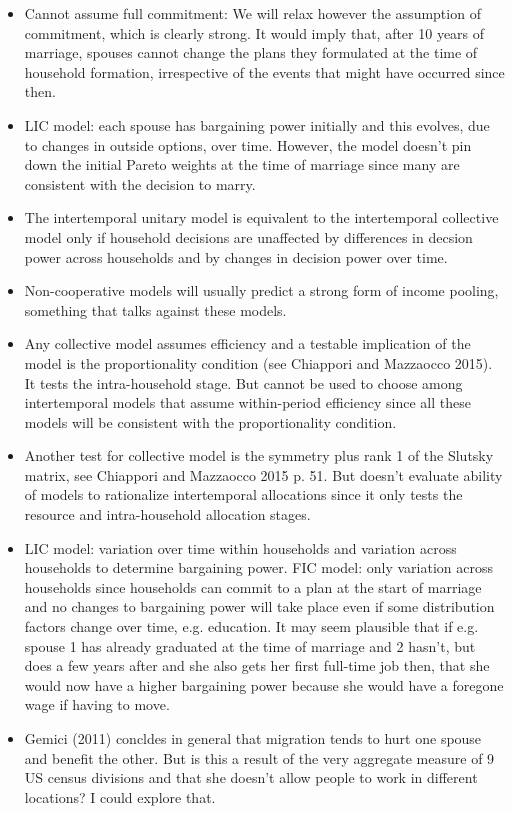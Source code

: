 \begin{itemize}
\begin{itemize}
\end{itemize}
\item Cannot assume full commitment: We will relax however the assumption of commitment, which is clearly strong. It would imply that, after 10 years of marriage, spouses cannot change the plans they formulated at the time of household formation, irrespective of the events that might have occurred since then.
\item LIC model: each spouse has bargaining power initially and this evolves, due to changes in outside options, over time. However, the model doesn't pin down the initial Pareto weights at the time of marriage since many are consistent with the decision to marry.
\item The intertemporal unitary model is equivalent to the intertemporal collective model only if household decisions are unaffected by differences in decsion power across households and by changes in decision power over time.
\item Non-cooperative models will usually predict a strong form of income pooling, something that talks against these models.
\item Any collective model assumes efficiency and a testable implication of the model is the proportionality condition (see Chiappori and Mazzaocco 2015). It tests the intra-household stage. But cannot be used to choose among intertemporal models that assume within-period efficiency since all these models will be consistent with the proportionality condition.
\item Another test for collective model is the symmetry plus rank 1 of the Slutsky matrix, see Chiappori and Mazzaocco 2015 p. 51. But doesn't evaluate ability of models to rationalize intertemporal allocations since it only tests the resource and intra-household allocation stages.
\item LIC model: variation over time within households and variation across households to determine bargaining power. FIC model: only variation across households since households can commit to a plan at the start of marriage and no changes to bargaining power will take place even if some distribution factors change over time, e.g. education. It may seem plausible that if e.g. spouse 1 has already graduated at the time of marriage and 2 hasn't, but does a few years after and she also gets her first full-time job then, that she would now have a higher bargaining power because she would have a foregone wage if having to move.
\item Gemici (2011) concldes in general that migration tends to hurt one spouse and benefit the other. But is this a result of the very aggregate measure of 9 US census divisions and that she doesn't allow people to work in different locations? I could explore that.

\end{itemize}
